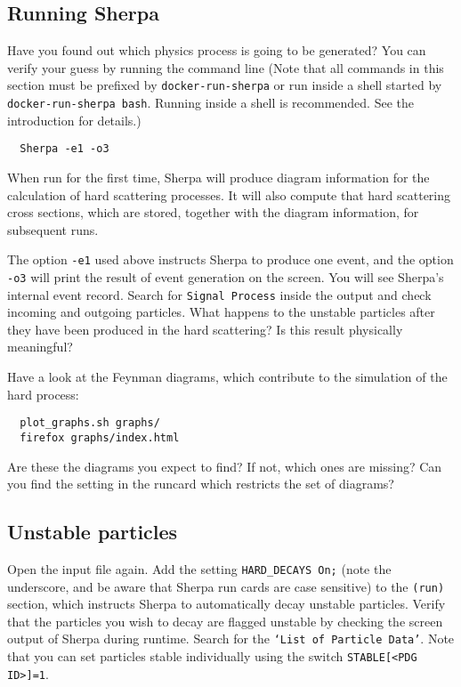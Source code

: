 \documentclass[10pt]{article}
\begin{document}
\subsection{Running Sherpa}
\label{sec:running_sherpa}

Have you found out which physics process is going to be generated?
You can verify your guess by running the command line (Note that all commands
in this section must be prefixed by {\tt docker-run-sherpa} or run inside a shell
started by {\tt docker-run-sherpa bash}. Running inside a shell is recommended.
See the introduction for details.)
\begin{verbatim}
  Sherpa -e1 -o3
\end{verbatim}
When run for the first time, Sherpa will produce diagram information for the calculation
of hard scattering processes. It will also compute that hard scattering cross sections,
which are stored, together with the diagram information, for subsequent runs.

The option {\tt -e1} used above instructs Sherpa to produce one event, and the option 
{\tt -o3} will print the result of event generation on the screen. You will see Sherpa's 
internal event record. Search for {\tt Signal Process} inside the output and check 
incoming and outgoing particles.
What happens to the unstable particles after they have been produced in the hard 
scattering? Is this result physically meaningful?

Have a look at the Feynman diagrams, which contribute to the simulation of the hard process:
\begin{verbatim}
  plot_graphs.sh graphs/
  firefox graphs/index.html
\end{verbatim}
Are these the diagrams you expect to find? If not, which ones are missing?
Can you find the setting in the runcard which restricts the set of diagrams?

\subsection{Unstable particles}

Open the input file again. Add the setting {\tt HARD\_DECAYS On;}
(note the underscore, and be aware that Sherpa run cards are case sensitive) to
the {\tt(run)} section, which instructs Sherpa to automatically  
decay unstable particles. Verify that the particles you wish to decay are
flagged unstable by checking the screen output of Sherpa during runtime. 
Search for the {\tt `List of Particle Data'}. Note that you can set particles
stable individually using the switch {\tt STABLE[<PDG ID>]=1}.
\end{document}
